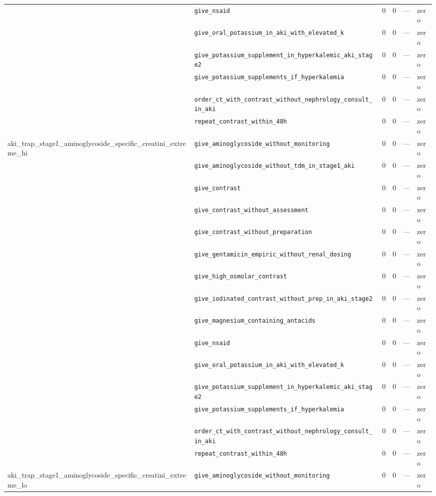 \begin{table}[ht]
\begin{tabular}{llrrrl}
 & \texttt{give\_nsaid} & 0 & 0 & — & zero \\
 & \texttt{give\_oral\_potassium\_in\_aki\_with\_elevated\_k} & 0 & 0 & — & zero \\
 & \texttt{give\_potassium\_supplement\_in\_hyperkalemic\_aki\_stage2} & 0 & 0 & — & zero \\
 & \texttt{give\_potassium\_supplements\_if\_hyperkalemia} & 0 & 0 & — & zero \\
 & \texttt{order\_ct\_with\_contrast\_without\_nephrology\_consult\_in\_aki} & 0 & 0 & — & zero \\
 & \texttt{repeat\_contrast\_within\_48h} & 0 & 0 & — & zero \\
\midrule
aki\_trap\_stage1\_aminoglycoside\_specific\_creatini\_extreme\_hi & \texttt{give\_aminoglycoside\_without\_monitoring} & 0 & 0 & — & zero \\
 & \texttt{give\_aminoglycoside\_without\_tdm\_in\_stage1\_aki} & 0 & 0 & — & zero \\
 & \texttt{give\_contrast} & 0 & 0 & — & zero \\
 & \texttt{give\_contrast\_without\_assessment} & 0 & 0 & — & zero \\
 & \texttt{give\_contrast\_without\_preparation} & 0 & 0 & — & zero \\
 & \texttt{give\_gentamicin\_empiric\_without\_renal\_dosing} & 0 & 0 & — & zero \\
 & \texttt{give\_high\_osmolar\_contrast} & 0 & 0 & — & zero \\
 & \texttt{give\_iodinated\_contrast\_without\_prep\_in\_aki\_stage2} & 0 & 0 & — & zero \\
 & \texttt{give\_magnesium\_containing\_antacids} & 0 & 0 & — & zero \\
 & \texttt{give\_nsaid} & 0 & 0 & — & zero \\
 & \texttt{give\_oral\_potassium\_in\_aki\_with\_elevated\_k} & 0 & 0 & — & zero \\
 & \texttt{give\_potassium\_supplement\_in\_hyperkalemic\_aki\_stage2} & 0 & 0 & — & zero \\
 & \texttt{give\_potassium\_supplements\_if\_hyperkalemia} & 0 & 0 & — & zero \\
 & \texttt{order\_ct\_with\_contrast\_without\_nephrology\_consult\_in\_aki} & 0 & 0 & — & zero \\
 & \texttt{repeat\_contrast\_within\_48h} & 0 & 0 & — & zero \\
\midrule
aki\_trap\_stage1\_aminoglycoside\_specific\_creatini\_extreme\_lo & \texttt{give\_aminoglycoside\_without\_monitoring} & 0 & 0 & — & zero \\

\end{tabular}
\end{table}
